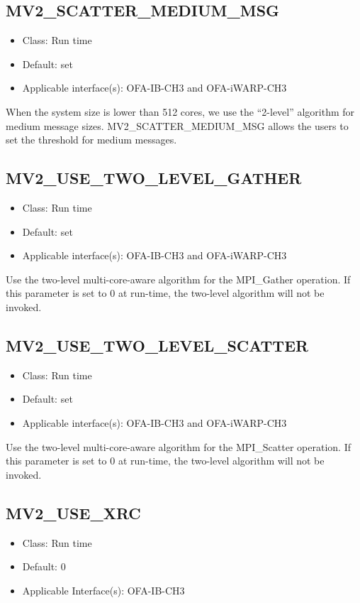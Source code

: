 \subsection{MV2\_SCATTER\_MEDIUM\_MSG}
\label{def:mv2_scatter_medium_msg}
\begin{itemize}
    \item Class: Run time
    \item Default: set
    \item Applicable interface(s): OFA-IB-CH3 and OFA-iWARP-CH3
\end{itemize}
When the system size is lower than 512 cores, we use the ``2-level'' algorithm for medium message sizes.
MV2\_SCATTER\_MEDIUM\_MSG allows the users to set the threshold for medium messages.

\subsection{MV2\_USE\_TWO\_LEVEL\_GATHER}
\label{def:mv2_use_two_level_gather}
\begin{itemize}
    \item Class: Run time
    \item Default: set
    \item Applicable interface(s): OFA-IB-CH3 and OFA-iWARP-CH3
\end{itemize}
Use the two-level multi-core-aware algorithm for the MPI\_Gather operation. 
If this parameter is set to 0 at run-time, the two-level algorithm will not be invoked. 


\subsection{MV2\_USE\_TWO\_LEVEL\_SCATTER}
\label{def:mv2_use_two_level_scatter}
\begin{itemize}
    \item Class: Run time
    \item Default: set
    \item Applicable interface(s): OFA-IB-CH3 and OFA-iWARP-CH3
\end{itemize}
Use the two-level multi-core-aware algorithm for the MPI\_Scatter operation. 
If this parameter is set to 0 at run-time, the two-level algorithm will not be invoked. 

\subsection{MV2\_USE\_XRC}
\label{def:mv2_use_xrc}
\begin{itemize}
    \item Class: Run time
    \item Default: 0
	\item Applicable Interface(s): OFA-IB-CH3
\end{itemize}

